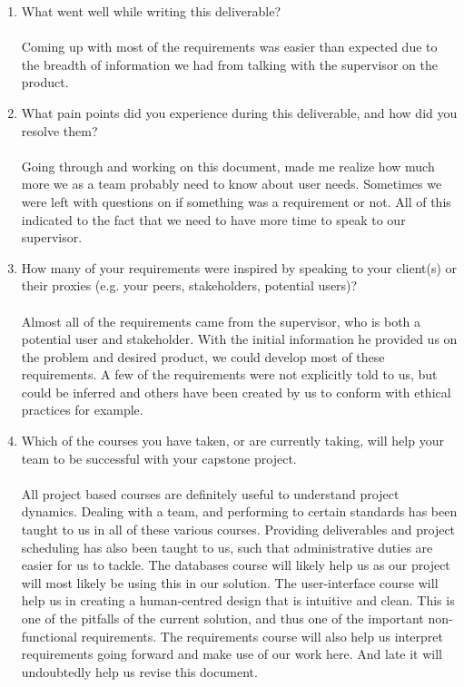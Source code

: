 \documentclass[12pt]{article}
\begin{document}
\begin{enumerate}
  \item What went well while writing this deliverable?\\\\
  Coming up with most of the requirements was easier than expected due to the breadth of information we had from talking with the supervisor on the product.
  
  
  \item What pain points did you experience during this deliverable, and how
  did you resolve them?\\\\
  Going through and working on this document, made me realize how much more we as a team probably need to know about user needs. Sometimes we were left with questions on if something was a requirement or not. All of this indicated to the fact that we need to have more time to speak to our supervisor.
  
  \item How many of your requirements were inspired by speaking to your
  client(s) or their proxies (e.g. your peers, stakeholders, potential users)?\\\\
  Almost all of the requirements came from the supervisor, who is both a potential user and stakeholder. With the initial information he provided us on the problem and desired product, we could develop most of these requirements. A few of the requirements were not explicitly told to us, but could be inferred and others have been created by us to conform with ethical practices for example.
  
  \item Which of the courses you have taken, or are currently taking, will help
  your team to be successful with your capstone project.\\\\
  All project based courses are definitely useful to understand project dynamics. Dealing with a team, and performing to certain standards has been taught to us in all of these various courses. Providing deliverables and project scheduling has also been taught to us, such that administrative duties are easier for us to tackle. The databases course will likely help us as our project will most likely be using this in our solution. The user-interface course will help us in creating a human-centred design that is intuitive and clean. This is one of the pitfalls of the current solution, and thus one of the important non-functional requirements. The requirements course will also help us interpret requirements going forward and make use of our work here. And late it will undoubtedly help us revise this document.

\end{enumerate}
\end{document}
